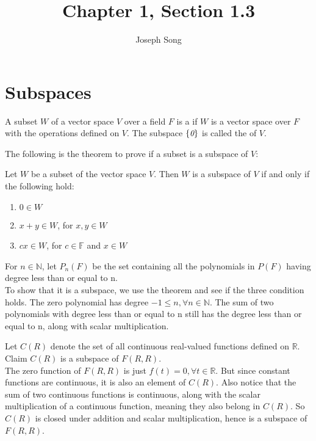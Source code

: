 \documentclass{article}
\title{Chapter 1, Section 1.3}
\author{Joseph Song}
\date{}
\begin{document}
 
 \maketitle
 
 \section{Subspaces}
 
 \begin{definition}[Subspace]
 A subset $W$ of a vector space $V$ over a field $F$ is a  if $W$ is a vector space over $F$ with the operations defined on $V$. The subspace $\{ \emph{0} \}$ is called the  of $V$.
 \end{definition}
 
 The following is the theorem to prove if a subset is a subspace of $V$:
 \begin{theorem}
     Let $W$ be a subset of the vector space $V$. Then $W$ is a subspace of $V$ if and only if the following hold:
 \end{theorem}
 \begin{enumerate}[label=(\arabic*)]
     \item $0 \in W$
     \item $x + y \in W$, for $x, y \in W$
     \item $cx \in W$, for $c \in \mathbb{F}$ and $x \in W$
 \end{enumerate}
 \begin{example}[Polynomials]
 \end{example}
 For $n \in \mathbb{N}$, let $P_n(F)$ be the set containing all the polynomials in $P(F)$ having degree less than or equal to n.
 \\
 To show that it is a subspace, we use the theorem and see if the three condition holds. The zero polynomial has degree $-1 \leq n, \forall n \in \mathbb{N}$.
 The sum of two polynomials with degree less than or equal to n still has the degree less than or equal to n, along with scalar multiplication.
 
 \begin{example}[Functions]
 \end{example}
 
 Let $C(R)$ denote the set of all continuous real-valued functions defined on $\mathbb{R}$. Claim $C(R)$ is a subspace of $F(R, R)$.
 \\
 The zero function of $F(R,R)$ is just $f(t) = 0, \forall t\in \mathbb{R}$. But since constant functions are continuous, it is also an element of $C(R)$. Also notice that the sum of two continuous functions is continuous, along with the scalar multiplication of a continuous function, meaning they also belong in $C(R)$. So $C(R)$ is closed under addition and scalar multiplication, hence is a subspace of $F(R,R)$.
 \\
 
 
 
\end{document}
